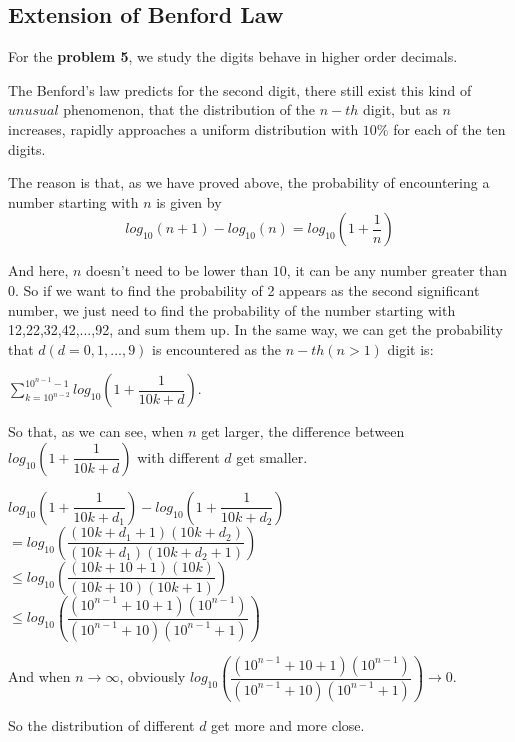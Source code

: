 \documentclass[12pt]{article}
\begin{document}
\subsection{Extension of Benford Law}
For the \textbf{problem 5}, we study the digits behave in higher order decimals.
\par The Benford's law predicts for the second digit, there still exist this kind of $unusual$ phenomenon, that the distribution of the $n-th$ digit, but as $n$ increases, rapidly approaches a uniform distribution with $10\%$ for each of the ten digits.\\
\par The reason is that, as we have proved above, the probability of encountering a number starting with $n$ is given by
\begin{equation*}
log_{10}(n+1)-log_{10}(n)=log_{10}(1+\dfrac{1}{n})
\end{equation*}
\par And here, $n$ doesn't need to be lower than $10$, it can be any number greater than $0$. So if we want to find the probability of 2 appears as the second significant number, we just need to find the probability of the number starting with 12,22,32,42,...,92, and sum them up. In the same way, we can get the probability that $d(d=0,1,...,9)$ is encountered as the $n-th(n>1)$ digit is:\\
\begin{center}
$\sum\limits_{k=10^{n-2}}^{10^{n-1}-1}log_{10}(1+\dfrac{1}{10k+d})$.
\end{center}
\par So that, as we can see, when $n$ get larger, the difference between $log_{10}(1+\dfrac{1}{10k+d})$ with different $d$ get smaller.
\begin{center}
$log_{10}(1+\dfrac{1}{10k+d_1})-log_{10}(1+\dfrac{1}{10k+d_2})$\\
$=log_{10}(\dfrac{(10k+d_1+1)(10k+d_2)}{(10k+d_1)(10k+d_2+1)})$\\
$\leq log_{10}(\dfrac{(10k+10+1)(10k)}{(10k+10)(10k+1)})$\\
$\leq log_{10}(\dfrac{(10^{n-1}+10+1)(10^{n-1})}{(10^{n-1}+10)(10^{n-1}+1)})$\\
\end{center}
\par And when $n\rightarrow \infty$, obviously $log_{10}(\dfrac{(10^{n-1}+10+1)(10^{n-1})}{(10^{n-1}+10)(10^{n-1}+1)})\rightarrow 0$.\\
\par So the distribution of different $d$ get more and more close.\\
\end{document}
